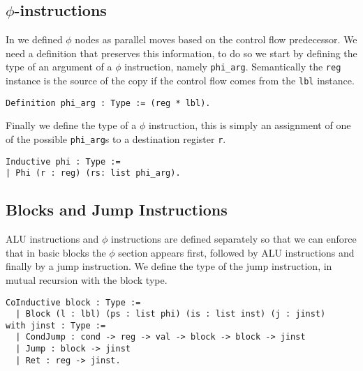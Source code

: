 \subsection{$\phi$-instructions}

In  we defined $\phi$ nodes as parallel moves based on the control flow predecessor.
We need a definition that preserves this information, to do so we start by defining the type of an argument of a $\phi$ instruction, namely \texttt{phi\_arg}. Semantically the \texttt{reg} instance is the source of the copy if the control flow comes from the \texttt{lbl} instance.

\begin{lstlisting}[style=Coq]
Definition phi_arg : Type := (reg * lbl).
\end{lstlisting}

Finally we define the type of a $\phi$ instruction, this is simply an assignment of one of the possible \texttt{phi\_arg}s to a destination register \texttt{r}.

\begin{lstlisting}[style=Coq]
Inductive phi : Type :=
| Phi (r : reg) (rs: list phi_arg).
\end{lstlisting}


\subsection{Blocks and Jump Instructions}

ALU instructions and $\phi$ instructions are defined separately so that we can enforce that in basic blocks the $\phi$ section appears first, followed by ALU instructions and finally by a jump instruction.
We define the type of the jump instruction, in mutual recursion with the block type.

\begin{lstlisting}[style=Coq]
CoInductive block : Type :=
  | Block (l : lbl) (ps : list phi) (is : list inst) (j : jinst)
with jinst : Type :=
  | CondJump : cond -> reg -> val -> block -> block -> jinst
  | Jump : block -> jinst
  | Ret : reg -> jinst.
\end{lstlisting}

